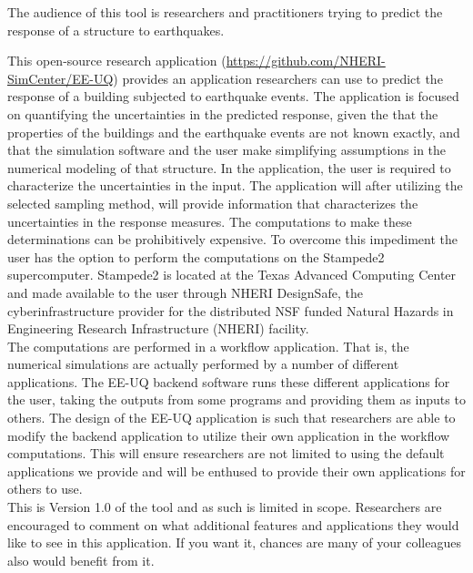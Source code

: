 The audience of this tool is researchers and practitioners trying to
predict the response of a structure to earthquakes.

This open-source research application
(\href{https://github.com/NHERI-SimCenter/EE-UQ}{https://github.com/NHERI-SimCenter/EE-UQ})
provides an application researchers can use to predict the response of
a building subjected to earthquake events. The application is focused
on quantifying the uncertainties in the predicted response, given the
that the properties of the buildings and the earthquake events are not
known exactly, and that the simulation software and the user make
simplifying assumptions in the numerical modeling of that
structure. In the application, the user is required to characterize
the uncertainties in the input. The application will after utilizing
the selected sampling method, will provide information that
characterizes the uncertainties in the response measures. The
computations to make these determinations can be prohibitively
expensive. To overcome this impediment the user has the option to
perform the computations on the Stampede2 supercomputer. Stampede2 is
located at the Texas Advanced Computing Center and made available to
the user through NHERI DesignSafe, the cyberinfrastructure provider
for the distributed NSF funded Natural Hazards in Engineering Research
Infrastructure (NHERI) facility.\\

The computations are performed in a workflow application. That is, the
numerical simulations are actually performed by a number of different
applications. The EE-UQ backend software runs these different
applications for the user, taking the outputs from some programs and
providing them as inputs to others. The design of the EE-UQ
application is such that researchers are able to modify the backend
application to utilize their own application in the workflow
computations. This will ensure researchers are not limited to using
the default applications we provide and will be enthused to provide
their own applications for others to use. \\

This is Version 1.0 of the tool and as such is limited in
scope. Researchers are encouraged to comment on what additional
features and applications they would like to see in this
application. If you want it, chances are many of your colleagues also
would benefit from it.\\
\\
